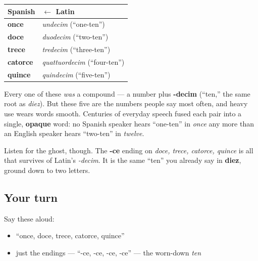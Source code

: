 \begin{cousinweb}
\noindent
\begin{tabularx}{\linewidth}{@{}>{\raggedright\arraybackslash}X>{\raggedright\arraybackslash}X@{}}
\toprule
\textbf{Spanish} & \textbf{$\leftarrow$ Latin} \\
\midrule
\textbf{once} & \emph{undecim} (\textquotedblleft{}one-ten\textquotedblright{}) \\
\textbf{doce} & \emph{duodecim} (\textquotedblleft{}two-ten\textquotedblright{}) \\
\textbf{trece} & \emph{tredecim} (\textquotedblleft{}three-ten\textquotedblright{}) \\
\textbf{catorce} & \emph{quattuordecim} (\textquotedblleft{}four-ten\textquotedblright{}) \\
\textbf{quince} & \emph{quindecim} (\textquotedblleft{}five-ten\textquotedblright{}) \\
\bottomrule
\end{tabularx}

Every one of these \emph{was} a compound — a number plus \textbf{-decim} (\textquotedblleft{}ten,\textquotedblright{} the same root as \emph{diez}). But these five are the numbers people say most often, and heavy use wears words smooth. Centuries of everyday speech fused each pair into a single, \textbf{opaque} word: no Spanish speaker hears \textquotedblleft{}one-ten\textquotedblright{} in \emph{once} any more than an English speaker hears \textquotedblleft{}two-ten\textquotedblright{} in \emph{twelve}.

Listen for the ghost, though. The \textbf{-ce} ending on \emph{doce, trece, catorce, quince} is all that survives of Latin's \emph{-decim}. It is the same \textquotedblleft{}ten\textquotedblright{} you already say in \textbf{diez}, ground down to two letters.
\end{cousinweb}

\subsection*{Your turn}
Say these aloud:

\begin{itemize}
\raggedright
  \item \textquotedblleft{}once, doce, trece, catorce, quince\textquotedblright{}
  \item just the endings — \textquotedblleft{}-ce, -ce, -ce, -ce\textquotedblright{} — the worn-down \emph{ten}
\end{itemize}

